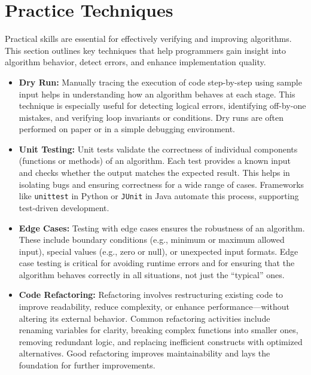 \documentclass[12pt]{article}
\begin{document}


\section{Practice Techniques}

Practical skills are essential for effectively verifying and improving algorithms. This section outlines key techniques that help programmers gain insight into algorithm behavior, detect errors, and enhance implementation quality.

\begin{itemize}
    \item \textbf{Dry Run:} Manually tracing the execution of code step-by-step using sample input helps in understanding how an algorithm behaves at each stage. This technique is especially useful for detecting logical errors, identifying off-by-one mistakes, and verifying loop invariants or conditions. Dry runs are often performed on paper or in a simple debugging environment.

    \item \textbf{Unit Testing:} Unit tests validate the correctness of individual components (functions or methods) of an algorithm. Each test provides a known input and checks whether the output matches the expected result. This helps in isolating bugs and ensuring correctness for a wide range of cases. Frameworks like \texttt{unittest} in Python or \texttt{JUnit} in Java automate this process, supporting test-driven development.

    \item \textbf{Edge Cases:} Testing with edge cases ensures the robustness of an algorithm. These include boundary conditions (e.g., minimum or maximum allowed input), special values (e.g., zero or null), or unexpected input formats. Edge case testing is critical for avoiding runtime errors and for ensuring that the algorithm behaves correctly in all situations, not just the ``typical'' ones.

    \item \textbf{Code Refactoring:} Refactoring involves restructuring existing code to improve readability, reduce complexity, or enhance performance—without altering its external behavior. Common refactoring activities include renaming variables for clarity, breaking complex functions into smaller ones, removing redundant logic, and replacing inefficient constructs with optimized alternatives. Good refactoring improves maintainability and lays the foundation for further improvements.
\end{itemize}
\end{document}
